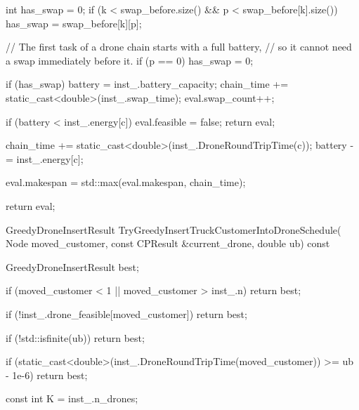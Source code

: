 {{{{{{                        int has_swap = 0;
                        if (k < swap_before.size() && p < swap_before[k].size())
                        {
                            has_swap = swap_before[k][p];
                        }

                        // The first task of a drone chain starts with a full battery,
                        // so it cannot need a swap immediately before it.
                        if (p == 0)
                        {
                            has_swap = 0;
                        }

                        if (has_swap)
                        {
                            battery = inst_.battery_capacity;
                            chain_time += static_cast<double>(inst_.swap_time);
                            eval.swap_count++;
                        }

                        if (battery < inst_.energy[c])
                        {
                            eval.feasible = false;
                            return eval;
                        }

                        chain_time += static_cast<double>(inst_.DroneRoundTripTime(c));
                        battery -= inst_.energy[c];
                    }

                    eval.makespan = std::max(eval.makespan, chain_time);
                }

                return eval;
            }

            GreedyDroneInsertResult TryGreedyInsertTruckCustomerIntoDroneSchedule(
                Node moved_customer,
                const CPResult &current_drone,
                double ub) const
            {
                GreedyDroneInsertResult best;

                if (moved_customer < 1 || moved_customer > inst_.n)
                {
                    return best;
                }

                if (!inst_.drone_feasible[moved_customer])
                {
                    return best;
                }

                if (!std::isfinite(ub))
                {
                    return best;
                }

                if (static_cast<double>(inst_.DroneRoundTripTime(moved_customer)) >= ub - 1e-6)
                {
                    return best;
                }

                const int K = inst_.n_drones;

}}}}

